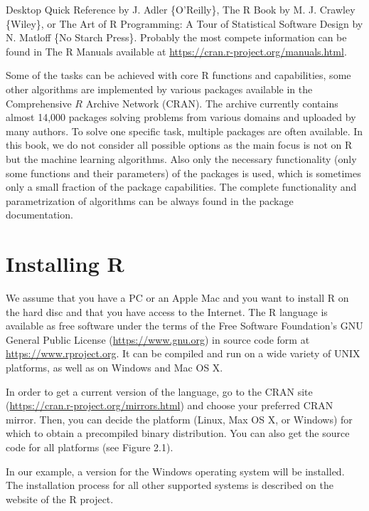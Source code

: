 \documentclass[11pt,openany,executivepaper]{book}
\begin{document}
Desktop Quick Reference by J. Adler \{O'Reilly\}, The R Book by M. J. Crawley \{Wiley\}, or The Art of R Programming: A Tour of Statistical Software Design by N. Matloff \{No Starch Press\}. Probably the most compete information can be found in The R Manuals available at \href{https://cran.r-project.org/manuals.html}{https://cran.r-project.org/manuals.html}.

Some of the tasks can be achieved with core R functions and capabilities, some other algorithms are implemented by various packages available in the Comprehensive $R$ Archive Network (CRAN). The archive currently contains almost 14,000 packages solving problems from various domains and uploaded by many authors. To solve one specific task, multiple packages are often available. In this book, we do not consider all possible options as the main focus is not on R but the machine learning algorithms. Also only the necessary functionality (only some functions and their parameters) of the packages is used, which is sometimes only a small fraction of the package capabilities. The complete functionality and parametrization of algorithms can be always found in the package documentation.

\section{Installing R}

We assume that you have a PC or an Apple Mac and you want to install R on the hard disc and that you have access to the Internet. The R language is available as free software under the terms of the Free Software Foundation's GNU General Public License (\href{https://www.gnu.org}{https://www.gnu.org}) in source code form at \href{https://www.rproject.org}{https://www.rproject.org}. It can be compiled and run on a wide variety of UNIX platforms, as well as on Windows and Mac OS X.

In order to get a current version of the language, go to the CRAN site (\href{https://cran.r-project.org/mirrors.html}{https://cran.r-project.org/mirrors.html}) and choose your preferred CRAN mirror. Then, you can decide the platform (Linux, Max OS X, or Windows) for which to obtain a precompiled binary distribution. You can also get the source code for all platforms (see Figure 2.1).

In our example, a version for the Windows operating system will be installed. The installation process for all other supported systems is described on the website of the R project.
\end{document}
